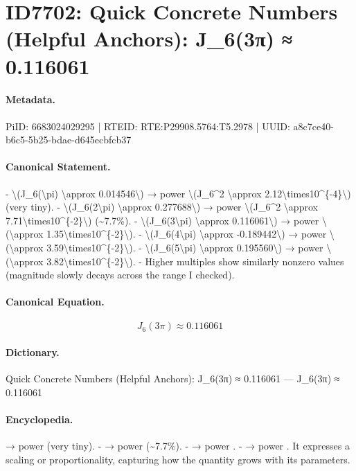 \section*{ID7702: Quick Concrete Numbers (Helpful Anchors): J\_6(3π) ≈ 0.116061}
\paragraph{Metadata.}
PiID: 6683024029295 | RTEID: RTE:P29908.5764:T5.2978 | UUID: a8c7ce40-b6c5-5b25-bdae-d645ecbfcb37

\paragraph{Canonical Statement.}
- \textbackslash{}(J\_6(\textbackslash{}pi) \textbackslash{}approx 0.014546\textbackslash{}) → power \textbackslash{}(J\_6\textasciicircum{}2 \textbackslash{}approx 2.12\textbackslash{}times10\textasciicircum{}\{-4\}\textbackslash{}) (very tiny). - \textbackslash{}(J\_6(2\textbackslash{}pi) \textbackslash{}approx 0.277688\textbackslash{}) → power \textbackslash{}(J\_6\textasciicircum{}2 \textbackslash{}approx 7.71\textbackslash{}times10\textasciicircum{}\{-2\}\textbackslash{}) (\textasciitilde{}7.7\%). - \textbackslash{}(J\_6(3\textbackslash{}pi) \textbackslash{}approx 0.116061\textbackslash{}) → power \textbackslash{}(\textbackslash{}approx 1.35\textbackslash{}times10\textasciicircum{}\{-2\}\textbackslash{}). - \textbackslash{}(J\_6(4\textbackslash{}pi) \textbackslash{}approx -0.189442\textbackslash{}) → power \textbackslash{}(\textbackslash{}approx 3.59\textbackslash{}times10\textasciicircum{}\{-2\}\textbackslash{}). - \textbackslash{}(J\_6(5\textbackslash{}pi) \textbackslash{}approx 0.195560\textbackslash{}) → power \textbackslash{}(\textbackslash{}approx 3.82\textbackslash{}times10\textasciicircum{}\{-2\}\textbackslash{}). - Higher multiples show similarly nonzero values (magnitude slowly decays across the range I checked).

\paragraph{Canonical Equation.}
\[
J_6(3\pi) \approx 0.116061
\]

\paragraph{Dictionary.}
Quick Concrete Numbers (Helpful Anchors): J\_6(3π) ≈ 0.116061 — J\_6(3π) ≈ 0.116061

\paragraph{Encyclopedia.}
→ power (very tiny). - → power (\textasciitilde{}7.7\%). - → power . - → power . It expresses a scaling or proportionality, capturing how the quantity grows with its parameters.
